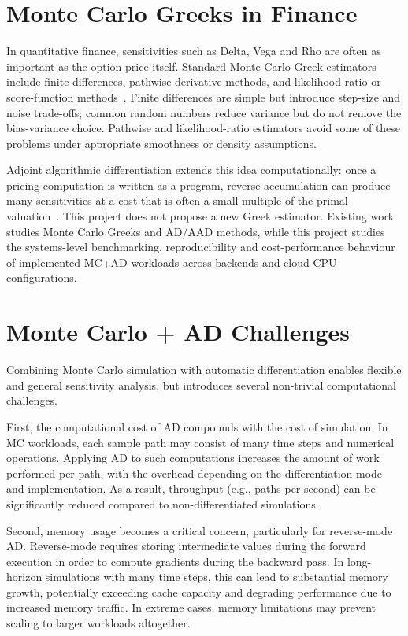 \section{Monte Carlo Greeks in Finance}

In quantitative finance, sensitivities such as Delta, Vega and Rho are often as
important as the option price itself. Standard Monte Carlo Greek estimators
include finite differences, pathwise derivative methods, and likelihood-ratio
or score-function methods~\cite{glasserman2004,giles2006smoking}. Finite
differences are simple but introduce step-size and noise trade-offs; common
random numbers reduce variance but do not remove the bias-variance choice.
Pathwise and likelihood-ratio estimators avoid some of these problems under
appropriate smoothness or density assumptions.

Adjoint algorithmic differentiation extends this idea computationally: once a
pricing computation is written as a program, reverse accumulation can produce
many sensitivities at a cost that is often a small multiple of the primal
valuation~\cite{capriotti2011fast}. This project does not propose a new Greek
estimator. Existing work studies Monte Carlo Greeks and AD/AAD methods, while
this project studies the systems-level benchmarking, reproducibility and
cost-performance behaviour of implemented MC+AD workloads across backends and
cloud CPU configurations.

\section{Monte Carlo + AD Challenges}

Combining Monte Carlo simulation with automatic differentiation enables flexible and general sensitivity analysis, but introduces several non-trivial computational challenges.

First, the computational cost of AD compounds with the cost of simulation. In MC workloads, each sample path may consist of many time steps and numerical operations. Applying AD to such computations increases the amount of work performed per path, with the overhead depending on the differentiation mode and implementation. As a result, throughput (e.g., paths per second) can be significantly reduced compared to non-differentiated simulations.

Second, memory usage becomes a critical concern, particularly for reverse-mode AD. Reverse-mode requires storing intermediate values during the forward execution in order to compute gradients during the backward pass. In long-horizon simulations with many time steps, this can lead to substantial memory growth, potentially exceeding cache capacity and degrading performance due to increased memory traffic. In extreme cases, memory limitations may prevent scaling to larger workloads altogether.

